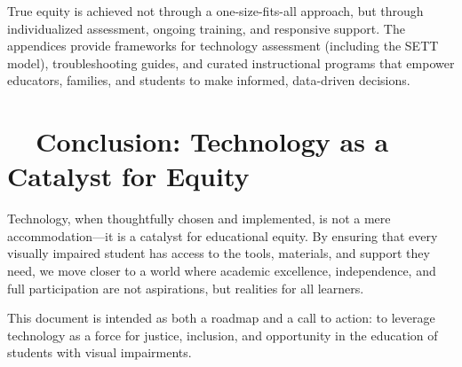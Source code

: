 True equity is achieved not through a one-size-fits-all approach, but through individualized assessment, ongoing training, and responsive support.\supercite{Presley2012, WATIAssessing} The appendices provide frameworks for technology assessment (including the SETT model\supercite{Zabala2005, Hollingshead2020}), troubleshooting guides, and curated instructional programs that empower educators, families, and students to make informed, data-driven decisions.

\section{~~Conclusion: Technology as a Catalyst for Equity}
\label{sec:intro-conclusion}

Technology, when thoughtfully chosen and implemented, is not a mere accommodation—it is a catalyst for educational equity. By ensuring that every visually impaired student has access to the tools, materials, and support they need, we move closer to a world where academic excellence, independence, and full participation are not aspirations, but realities for all learners.

\bigskip

This document is intended as both a roadmap and a call to action: to leverage technology as a force for justice, inclusion, and opportunity in the education of students with visual impairments.\supercite{Warschauer2003TechnologyAndSocialInclusion}